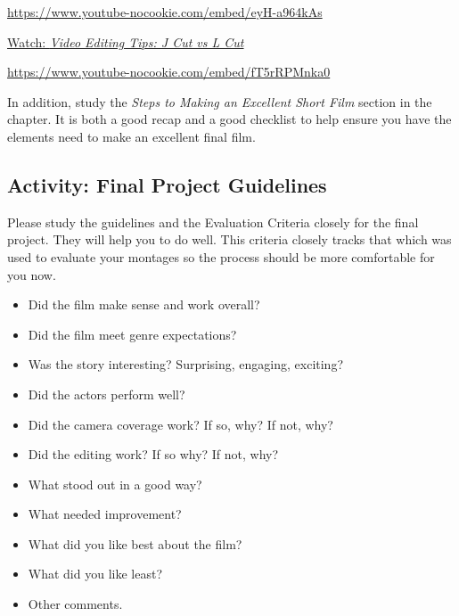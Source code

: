 \documentclass[
  letterpaper,
  DIV=11,
  numbers=noendperiod]{scrreprt}
\providecommand{\tightlist}{%
  \setlength{\itemsep}{0pt}\setlength{\parskip}{0pt}}\usepackage{longtable,booktabs,array}
\begin{document}
\url{https://www.youtube-nocookie.com/embed/eyH-a964kAs}

\href{https://www.youtube.com/watch?v=fT5rRPMnka0}{Watch: \emph{Video
Editing Tips: J Cut vs L Cut}}

\url{https://www.youtube-nocookie.com/embed/fT5rRPMnka0}

In addition, study the \emph{Steps to Making an Excellent Short Film}
section in the chapter. It is both a good recap and a good checklist to
help ensure you have the elements need to make an excellent final film.

\subsection{Activity: Final Project
Guidelines}\label{activity-final-project-guidelines}

\begin{tcolorbox}[enhanced jigsaw, opacityback=0, colframe=quarto-callout-note-color-frame, leftrule=.75mm, arc=.35mm, rightrule=.15mm, colbacktitle=quarto-callout-note-color!10!white, titlerule=0mm, colback=white, toprule=.15mm, bottomtitle=1mm, breakable, toptitle=1mm, title={Learning Activity}, coltitle=black, bottomrule=.15mm, left=2mm, opacitybacktitle=0.6]

Please study the guidelines and the Evaluation Criteria closely for the
final project. They will help you to do well. This criteria closely
tracks that which was used to evaluate your montages so the process
should be more comfortable for you now.

\begin{itemize}
\tightlist
\item
  Did the film make sense and work overall?
\item
  Did the film meet genre expectations?
\item
  Was the story interesting? Surprising, engaging, exciting?
\item
  Did the actors perform well?
\item
  Did the camera coverage work? If so, why? If not, why?
\item
  Did the editing work? If so why? If not, why?
\item
  What stood out in a good way?
\item
  What needed improvement?
\item
  What did you like best about the film?
\item
  What did you like least?
\item
  Other comments.
\end{itemize}

\end{tcolorbox}
\end{document}
